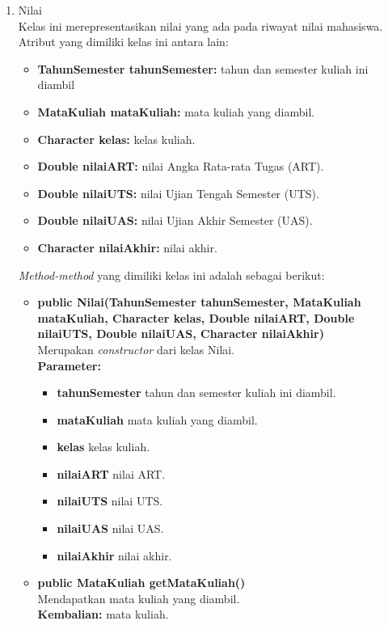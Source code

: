 \begin{enumerate}
\begin{enumerate}
		\item Nilai\\
		Kelas ini merepresentasikan nilai yang ada pada riwayat nilai mahasiswa. Atribut yang dimiliki kelas ini antara lain:
		\begin{itemize}
			\item \textbf{TahunSemester tahunSemester:} tahun dan semester kuliah ini diambil
			\item \textbf{MataKuliah mataKuliah:} mata kuliah yang diambil.
			\item \textbf{Character kelas:} kelas kuliah.
			\item \textbf{Double nilaiART:} nilai Angka Rata-rata Tugas (ART).
			\item \textbf{Double nilaiUTS:} nilai Ujian Tengah Semester (UTS).
			\item \textbf{Double nilaiUAS:} nilai Ujian Akhir Semester (UAS).
			\item \textbf{Character nilaiAkhir:} nilai akhir.
		\end{itemize}
	\textit{Method-method} yang dimiliki kelas ini adalah sebagai berikut:
		\begin{itemize}
			\item \textbf{public Nilai(TahunSemester tahunSemester, MataKuliah mataKuliah, Character kelas, Double nilaiART, Double nilaiUTS, Double nilaiUAS, Character nilaiAkhir)}\\
				Merupakan \textit{constructor} dari kelas Nilai.\\
				\textbf{Parameter:}
				\begin{itemize}
					\item \textbf{tahunSemester} tahun dan semester kuliah ini diambil.
					\item \textbf{mataKuliah} mata kuliah yang diambil.
					\item \textbf{kelas} kelas kuliah.
					\item \textbf{nilaiART} nilai ART.
					\item \textbf{nilaiUTS} nilai UTS.
					\item \textbf{nilaiUAS} nilai UAS.
					\item \textbf{nilaiAkhir} nilai akhir.
				\end{itemize}
				
			\item \textbf{public MataKuliah getMataKuliah()}\\
				Mendapatkan mata kuliah yang diambil.\\
				\textbf{Kembalian:} mata kuliah.
				

\end{itemize}
\end{enumerate}
\end{enumerate}

